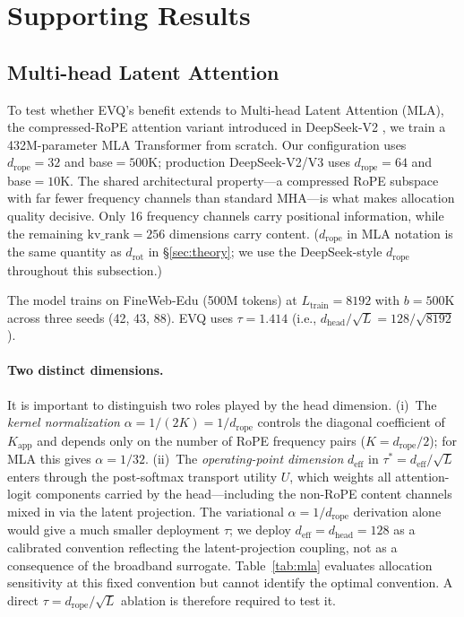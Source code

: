 \section{Supporting Results}

\subsection{Multi-head Latent Attention}
\label{sec:mla-results}

To test whether EVQ's benefit extends to Multi-head Latent Attention (MLA), the compressed-RoPE attention variant introduced in DeepSeek-V2 \citep{deepseekv2}, we train a 432M-parameter MLA Transformer from scratch. Our configuration uses \(d_{\mathrm{rope}}{=}32\) and base${}=500\mathrm{K}$; production DeepSeek-V2/V3 \citep{deepseekv3} uses \(d_{\mathrm{rope}}{=}64\) and base${}=10\mathrm{K}$. The shared architectural property---a compressed RoPE subspace with far fewer frequency channels than standard MHA---is what makes allocation quality decisive. Only 16 frequency channels carry positional information, while the remaining \(\mathrm{kv\_rank}{=}256\) dimensions carry content. ($d_{\mathrm{rope}}$ in MLA notation is the same quantity as $d_{\mathrm{rot}}$ in \S\ref{sec:theory}; we use the DeepSeek-style $d_{\mathrm{rope}}$ throughout this subsection.)

The model trains on FineWeb-Edu (500M tokens) at \(L_{\mathrm{train}}{=}8192\) with \(b{=}500\mathrm{K}\) across three seeds (42, 43, 88). EVQ uses \(\tau{=}1.414\) (i.e., \(d_{\mathrm{head}}/\sqrt{L} = 128/\sqrt{8192}\)).

\paragraph{Two distinct dimensions.} It is important to distinguish two roles played by the head dimension. (i)~The \emph{kernel normalization} $\alpha{=}1/(2K){=}1/d_{\mathrm{rope}}$ controls the diagonal coefficient of $K_{\mathrm{app}}$ and depends only on the number of RoPE frequency pairs ($K{=}d_{\mathrm{rope}}/2$); for MLA this gives $\alpha{=}1/32$. (ii)~The \emph{operating-point dimension} $d_{\mathrm{eff}}$ in $\tau^*{=}d_{\mathrm{eff}}/\sqrt{L}$ enters through the post-softmax transport utility $U$, which weights all attention-logit components carried by the head---including the non-RoPE content channels mixed in via the latent projection. The variational $\alpha{=}1/d_{\mathrm{rope}}$ derivation alone would give a much smaller deployment $\tau$; we deploy $d_{\mathrm{eff}}{=}d_{\mathrm{head}}{=}128$ as a calibrated convention reflecting the latent-projection coupling, not as a consequence of the broadband surrogate. Table~\ref{tab:mla} evaluates allocation sensitivity at this fixed convention but cannot identify the optimal convention. A direct $\tau{=}d_{\mathrm{rope}}/\sqrt{L}$ ablation is therefore required to test it.

